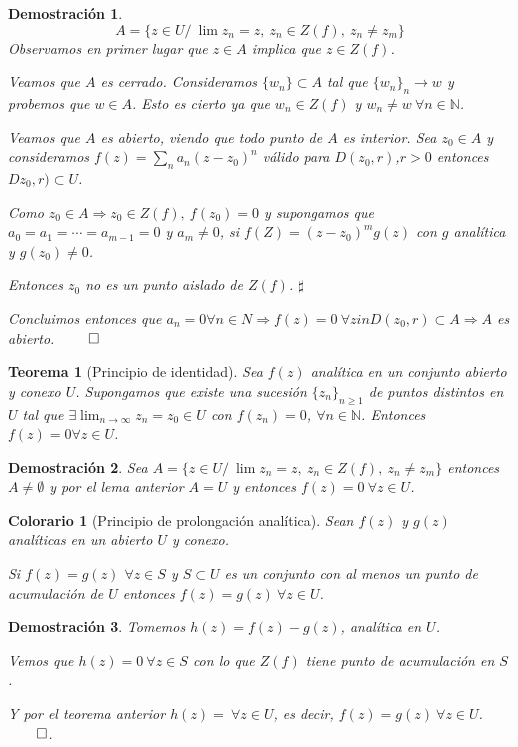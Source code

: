 \documentclass[10pt]{book}
\newtheorem{theorem}{Teorema}[chapter]
\newtheorem*{dem}{Demostración}
\newtheorem{col}{Colorario}[chapter]
\newcommand{\N}{\mathbb{N}}
\begin{document}
\begin{dem}
$$A = \{z\in U /\ \lim z_n = z,\ z_n\in Z(f),\ z_n\neq z_m\}$$
Observamos en primer lugar que $z\in A$ implica que $z\in Z(f)$.

Veamos que $A$ es cerrado. Consideramos $\{w_n\}\subset A$ tal que $\{w_n\}_n\to w$ y probemos que $w \in A$. Esto es cierto ya que $w_n\in Z(f)$ y $w_n\neq w\ \forall n\in\N$.

Veamos que $A$ es abierto, viendo que todo punto de $A$ es interior. Sea $z_0\in A$ y consideramos $f(z) = \sum_n a_n (z-z_0)^n$ válido para $D(z_0,r)$,$r>0$ entonces $Dz_0,r)\subset U$.

Como $z_0 \in A \Rightarrow z_0\in Z(f),\ f(z_0) = 0$ y supongamos que $a_0 = a_1 = \cdots=a_{m-1} = 0$ y $ a_m\neq 0$, si $f(Z) = (z-z_0)^m g(z)$ con $g$ analítica y $g(z_0)\neq 0$.

Entonces $z_0$ no es un punto aislado de $Z(f)$. $\sharp$

Concluimos entonces que $a_n = 0 \forall n\in N\Rightarrow f(z)=0\ \forall z in  D(z_0,r)\subset A \Rightarrow A$ es abierto. $\qed$
\end{dem}


\begin{theorem}[Principio de identidad]
Sea $f(z)$ analítica en un conjunto abierto y conexo $U$. Supongamos que  existe una sucesión $\{z_n\}_{n\geq 1}$ de puntos distintos en $U$ tal que $\exists \lim_{n\to \infty}z_n = z_0 \in U$ con $f(z_n)=0$, $\forall n \in \N$.  Entonces $f(z) =0 \forall z \in U$.
\end{theorem}

\begin{dem}
Sea $A = \{z\in U /\ \lim z_n = z,\ z_n\in Z(f),\ z_n\neq z_m\}$ entonces $A\neq \emptyset$ y por el lema anterior $A = U$ y entonces $f(z) = 0\ \forall z\in U$.
\end{dem}


\begin{col}[Principio de prolongación analítica]
Sean $f(z)$ y $g(z)$ analíticas en un abierto $U$ y conexo.

Si $f(z) = g(z)$ $\forall z\in S$ y $S\subset U$ es un conjunto con al menos un punto de acumulación de $U$ entonces $f(z) = g(z)\ \forall z\in U$.
\end{col}

\begin{dem}
Tomemos $h(z) = f(z)-g(z)$, analítica en $U$.

Vemos que $h(z) = 0\ \forall z \in S$ con lo que $Z(f)$ tiene punto de acumulación en $S$.

Y por el teorema anterior $h(z)= \ \forall z\in U$, es decir, $f(z) = g(z) \ \forall z \in U$. $\qed$.
\end{dem}
\end{document}
